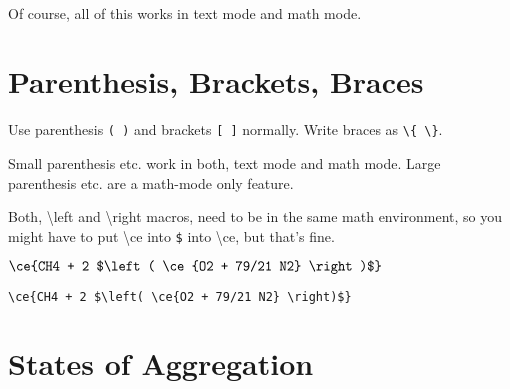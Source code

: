 \documentclass[a4paper,notitlepage,parskip=half]{scrreprt}
\newcommand\macro[1]{{\ttfamily\textbackslash#1}}
\begin{document}
\begin{SideBySideExample}[xrightmargin=2.5cm]
  \\
\end{SideBySideExample}

Of course, all of this works in text mode and math mode.


\section{Parenthesis, Brackets, Braces}

Use parenthesis \verb|( )| and brackets \verb|[ ]| normally. Write braces as \verb|\{ \}|.

\begin{SideBySideExample}[xrightmargin=4cm]
\end{SideBySideExample}

\begin{SideBySideExample}[xrightmargin=4cm]
\end{SideBySideExample}

Small parenthesis etc. work in both, text mode and math mode. Large parenthesis etc. are a math-mode only feature.

Both, \macro{left} and \macro{right} macros, need to be in the same math environment, so you might have to put \macro{ce} into \verb|$| into \macro{ce}, but that's fine.

$\displaystyle\ce{CH4 + 2 $\left( \ce{O2 + 79/21 N2} \right)$}$\par
{\raggedleft\verb|\ce{CH4 + 2 $\left( \ce{O2 + 79/21 N2} \right)$}|\par}


\section{States of Aggregation}

\begin{SideBySideExample}[xrightmargin=4cm]
\end{SideBySideExample}

\begin{SideBySideExample}[xrightmargin=4cm]
\end{SideBySideExample}

\begin{SideBySideExample}[xrightmargin=4cm]
\end{SideBySideExample}
\end{document}
